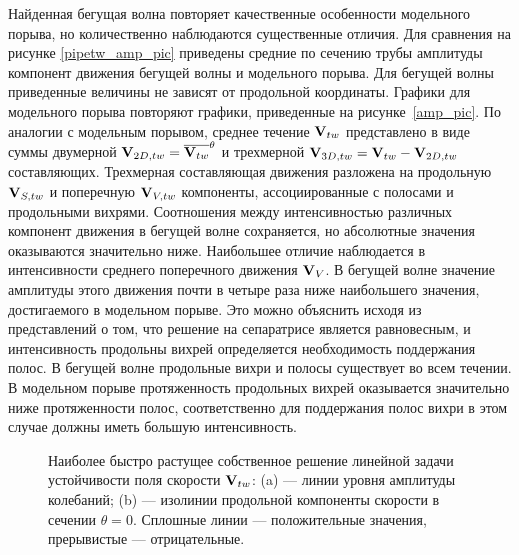 Найденная бегущая волна повторяет качественные особенности модельного порыва, но количественно наблюдаются существенные отличия. Для сравнения на рисунке \ref{pipetw_amp_pic} приведены средние по сечению трубы амплитуды компонент движения бегущей волны и модельного порыва. Для бегущей волны приведенные величины не зависят от продольной координаты. Графики для модельного порыва повторяют графики, приведенные на рисунке~\ref{amp_pic}. По аналогии с модельным порывом, среднее течение $\mathbf{V}_{tw}$ представлено в виде суммы двумерной $\mathbf{V}_{2D,tw} = \overline{\mathbf{V}_{tw}}^\theta$ и трехмерной  $\mathbf{V}_{3D,tw} = \mathbf{V}_{tw} - \mathbf{V}_{2D,tw}$ составляющих. Трехмерная составляющая движения разложена на продольную $\mathbf{V}_{S,tw}$ и поперечную $\mathbf{V}_{V,tw}$ компоненты, ассоциированные с полосами и продольными вихрями. Соотношения между интенсивностью различных компонент движения в бегущей волне сохраняется, но абсолютные значения оказываются значительно ниже. Наибольшее отличие наблюдается в интенсивности среднего поперечного движения $\mathbf{V}_V$. В бегущей волне значение амплитуды этого движения почти в четыре раза ниже наибольшего значения, достигаемого в модельном порыве. Это можно объяснить исходя из представлений о том, что решение на сепаратрисе является равновесным, и интенсивность продольны вихрей определяется необходимость поддержания полос. В бегущей волне продольные вихри и полосы существует во всем течении. В модельном порыве протяженность продольных вихрей оказывается значительно ниже протяженности полос, соответственно для поддержания полос вихри в этом случае должны иметь большую интенсивность. 


\begin{figure}
\caption{Наиболее быстро растущее собственное решение линейной задачи устойчивости поля скорости $\mathbf{V}_{tw}$: (a) --- линии уровня амплитуды колебаний; (b) --- изолинии продольной компоненты скорости в сечении $\theta = 0$. Сплошные линии --- положительные значения, прерывистые --- отрицательные.}
\label{pipetw_lin_pic}
\end{figure}


